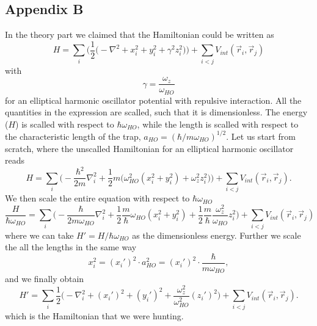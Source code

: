 \documentclass[norsk,a4paper,12pt]{article}
\begin{document}
\subsection{Appendix B}
In the theory part we claimed that the Hamiltonian could be written as
\begin{equation}
H=\sum_i\bigg(\frac{1}{2}\Big(-\nabla^2 + x_i^2 + y_i^2 + \gamma^2z_i^2\Big)\bigg)+\sum_{i<j}V_{int}(\vec{r}_i,\vec{r}_j)
\end{equation}
with
\begin{equation*}
\gamma=\frac{\omega_z}{\omega_{HO}}
\end{equation*}
for an elliptical harmonic oscillator potential with repulsive interaction. All the quantities in the expression are scalled, such that it is dimensionless. The energy ($H$) is scalled with respect to $\hbar\omega_{HO}$, while the length is scalled with respect to the characteristic length of the trap, $a_{HO}=(\hbar/m\omega_{HO})^{1/2}$. Let us start from scratch, where the unscalled Hamiltonian for an elliptical harmonic oscillator reads
\begin{equation*}
H=\sum_i\bigg(-\frac{\hbar^2}{2m}\nabla_i^2+\frac{1}{2}m\Big(\omega_{HO}^2(x_i^2+y_i^2)+\omega_z^2z_i^2\Big)\bigg)+\sum_{i<j}V_{int}(\vec{r}_i, \vec{r}_j).
\end{equation*}
We then scale the entire equation with respect to $\hbar\omega_{HO}$
\begin{equation*}
\frac{H}{\hbar\omega_{HO}}=\sum_i\bigg(-\frac{\hbar}{2m\omega_{HO}}\nabla_i^2+\frac{1}{2}\frac{m}{\hbar}\omega_{HO}(x_i^2+y_i^2)+\frac{1}{2}\frac{m}{\hbar}\frac{\omega_z^2}{\omega_{HO}}z_i^2\bigg)+\sum_{i<j}V_{int}(\vec{r}_i, \vec{r}_j)
\end{equation*}
where we can take $H'=H/\hbar\omega_{HO}$ as the dimensionless energy. Further we scale the all the lengths in the same way
\begin{equation*}
x_i^2=(x_i')^2\cdot a_{HO}^2=(x_i')^2\cdot\frac{\hbar}{m\omega_{HO}},
\end{equation*}
and we finally obtain
\begin{equation}
H'=\sum_i\frac{1}{2}\bigg(-\nabla_i^2+(x_i')^2+(y_i')^2+\frac{\omega_z^2}{\omega_{HO}^2}(z_i')^2\bigg)+\sum_{i<j}V_{int}(\vec{r}_i, \vec{r}_j).
\end{equation}
which is the Hamiltonian that we were hunting.
\end{document}
